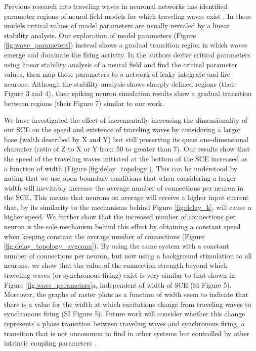 \documentclass[12pt]{article}
\begin{document}
Previous research into traveling waves in neuronal networks has identified parameter regions of neural-field models for which traveling waves exist \parencite{Wilson1973}\parencite{Ermentrout1979}. 
In these models critical values of model parameters are usually revealed by a linear stability analysis.
Our exploration of model parameters (Figure \ref{fig:wave_parameters}) instead shows a gradual transition region in which waves emerge and dominate the firing activity.
In \parencite{Senk2020} the authors derive critical parameters using linear stability analysis of a neural field and find the critical parameter values, then map those parameters to a network of leaky integrate-and-fire neurons.
Although the stability analysis shows sharply defined regions (their Figure 3 and 4), their spiking neuron simulation results show a gradual transition between regions (their Figure 7) similar to our work.

We have investigated the effect of incrementally increasing the dimensionality of our SCE on the speed and existence of traveling waves by considering a larger base (width described by X and Y) but still preserving its quasi one-dimensional character (ratio of Z to X or Y from 50 to greater than 7).
Our results show that the speed of the traveling waves initiated at the bottom of the SCE increased as a function of width (Figure \ref{fig:delay_topology}).
This can be understood by noting that we use open boundary conditions that when considering a larger width will inevitably increase the average number of connections per neuron in the SCE.
This means that neurons on average will receive a higher input current that, by its similarity to the mechanisms behind Figure \ref{fig:delay_k}, will cause a higher speed. 
We further show that the increased number of connections per neuron is the sole mechanism behind this effect by obtaining a constant speed when keeping constant the average number of connections (Figure \ref{fig:delay_topology_avgconn}).
By using the same system with a constant number of connections per neuron, but now using a background stimulation to all neurons, we show that the value of the connection strength beyond which traveling waves (or synchronous firing) exist is very similar to that shown in Figure \ref{fig:wave_parameters}a, independent of width of SCE (SI Figure 5).
Moreover, the graphs of raster plots as a function of width seem to indicate that there is a value for the width at which excitations change from traveling waves to synchronous firing (SI Figure 5).
Future work will consider whether this change represents a phase transition between traveling waves and synchronous firing, a transition that is not uncommon to find in other systems but controlled by other intrinsic coupling parameters \parencite{ermentrout2001}\parencite{Senk2020}.
\end{document}
